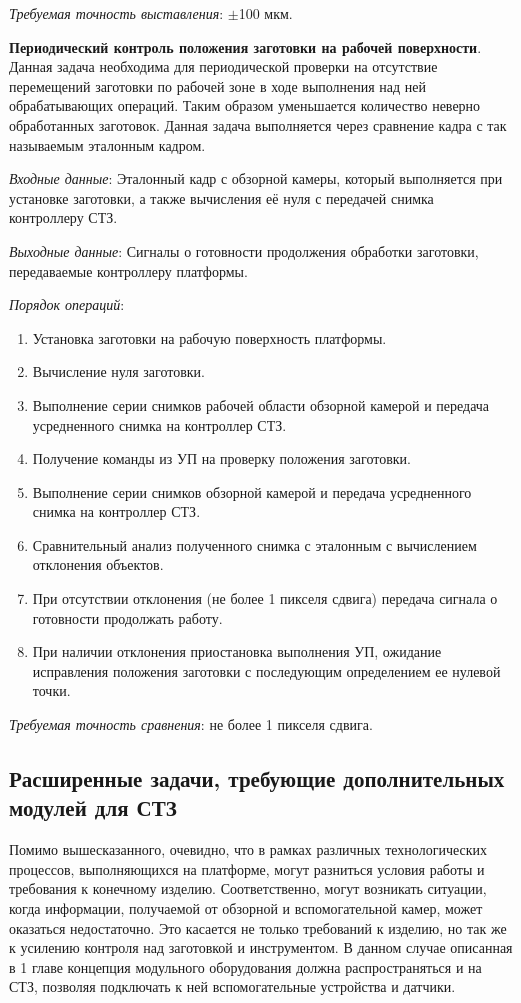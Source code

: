 \textit{Требуемая точность выставления}: $\pm$100 мкм.

\textbf{Периодический контроль положения заготовки на рабочей поверхности}. Данная задача необходима для периодической проверки на отсутствие перемещений заготовки по рабочей зоне в ходе выполнения над ней обрабатывающих операций. Таким образом уменьшается количество неверно обработанных заготовок. Данная задача выполняется через сравнение кадра с так называемым эталонным кадром.

\textit{Входные данные}: Эталонный кадр с обзорной камеры, который выполняется при установке заготовки, а также вычисления её нуля с передачей снимка контроллеру СТЗ.

\textit{Выходные данные}: Сигналы о готовности продолжения обработки заготовки, передаваемые контроллеру платформы.

\textit{Порядок операций}:

\begin{enumerate}
	\item Установка заготовки на рабочую поверхность платформы.
	\item Вычисление нуля заготовки.
	\item Выполнение серии снимков рабочей области обзорной камерой и передача усредненного снимка на контроллер СТЗ.
	\item Получение команды из УП на проверку положения заготовки.
	\item Выполнение серии снимков обзорной камерой и передача усредненного снимка на контроллер СТЗ.
	\item Сравнительный анализ полученного снимка с эталонным с вычислением отклонения объектов.
	\item При отсутствии отклонения (не более 1 пикселя сдвига) передача сигнала о готовности продолжать работу.
	\item При наличии отклонения приостановка выполнения УП, ожидание исправления положения заготовки с последующим определением ее нулевой точки.
\end{enumerate}

\textit{Требуемая точность сравнения}: не более 1 пикселя сдвига.

\subsection{Расширенные задачи, требующие дополнительных модулей для СТЗ} \label{ssect3_3_3}

Помимо вышесказанного, очевидно, что в рамках различных технологических процессов, выполняющихся на платформе, могут разниться условия работы и требования к конечному изделию. Соответственно, могут возникать ситуации, когда информации, получаемой от обзорной и вспомогательной камер, может оказаться недостаточно. Это касается не только требований к изделию, но так же к усилению контроля над заготовкой и инструментом. В данном случае описанная в 1 главе концепция модульного оборудования должна распространяться и на СТЗ, позволяя подключать к ней вспомогательные устройства и датчики.


